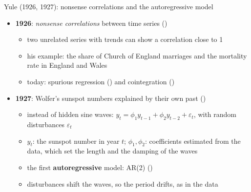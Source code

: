 \begin{frame}{Yule (1926, 1927): nonsense correlations and the autoregressive model}
\itemsize{\small}
\begin{itemize}
    \item \textbf{1926}: \emph{nonsense correlations} between time series ()
    \begin{itemize}
        \item two unrelated series with trends can show a correlation close to 1
        \item his example: the share of Church of England marriages and the mortality rate in England and Wales
        \item today: spurious regression () and cointegration ()
    \end{itemize}
    \item \textbf{1927}: Wolfer's sunspot numbers explained by their own past ()
    \begin{itemize}
        \item instead of hidden sine waves: $y_t = \phi_1 y_{t-1} + \phi_2 y_{t-2} + \varepsilon_t$, with random disturbances $\varepsilon_t$
        \item $y_t$: the sunspot number in year $t$; $\phi_1, \phi_2$: coefficients estimated from the data, which set the length and the damping of the waves
        \item the first \textbf{autoregressive} model: AR(2) ()
        \item disturbances shift the waves, so the period drifts, as in the data
    \end{itemize}
\end{itemize}
\end{frame}


